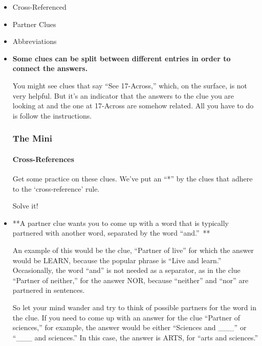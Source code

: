 \begin{itemize}
\tightlist
\item
  Cross-Referenced
\item
  Partner Clues
\item
  Abbreviations
\end{itemize}

\begin{itemize}
\item
  \textbf{Some clues can be split between different entries in order to
  connect the answers.}

  You might see clues that say ``See 17-Across,'' which, on the surface,
  is not very helpful. But it's an indicator that the answers to the
  clue you are looking at and the one at 17-Across are somehow related.
  All you have to do is follow the instructions.

  \hypertarget{the-mini-6}{%
  \subsubsection{The Mini}\label{the-mini-6}}

  \href{https://www.nytimes.com/crosswords/game/special/cross-references}{}

  \hypertarget{cross-references}{%
  \paragraph{Cross-References}\label{cross-references}}

  Get some practice on these clues. We've put an ``*'' by the clues that
  adhere to the `cross-reference' rule.

  Solve it!
\item
  **A partner clue wants you to come up with a word that is typically
  partnered with another word, separated by the word ``and.''~**

  An example of this would be the clue, ``Partner of live'' for which
  the answer would be LEARN, because the popular phrase is ``Live and
  learn.'' Occasionally, the word ``and'' is not needed as a separator,
  as in the clue ``Partner of neither,'' for the answer NOR, because
  ``neither'' and ``nor'' are partnered in sentences.

  So let your mind wander and try to think of possible partners for the
  word in the clue. If you need to come up with an answer for the clue
  ``Partner of sciences,'' for example, the answer would be either
  ``Sciences and \_\_\_'' or ``\_\_\_ and sciences.'' In this case, the
  answer is ARTS, for ``arts and sciences.''


\end{itemize}
